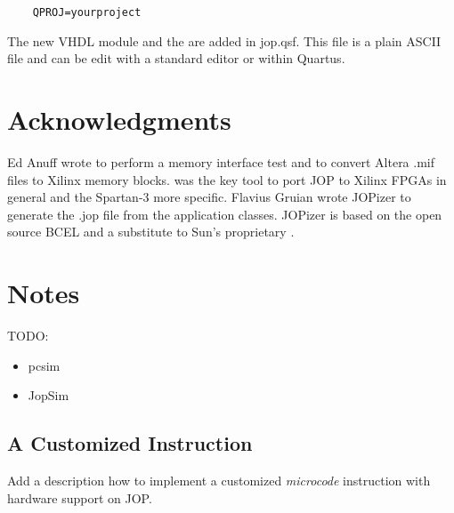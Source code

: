 \begin{verbatim}
    QPROJ=yourproject
\end{verbatim}

The new VHDL module and the  are added in
jop.qsf. This file is a plain ASCII file and can be edit with a
standard editor or within Quartus.



\section{Acknowledgments}

Ed Anuff wrote  to perform a memory interface test
and  to convert Altera .mif files to Xilinx
memory blocks.  was the key tool to port JOP to
Xilinx FPGAs in general and the Spartan-3 more specific. Flavius
Gruian wrote JOPizer to generate the .jop file from the application
classes. JOPizer is based on the open source BCEL and a substitute
to Sun's proprietary .

\section{Notes}

TODO:

\begin{itemize}
    \item pcsim
    \item JopSim
\end{itemize}


\subsection{A Customized Instruction}

Add a description how to implement a customized \emph{microcode}
instruction with hardware support on JOP.
